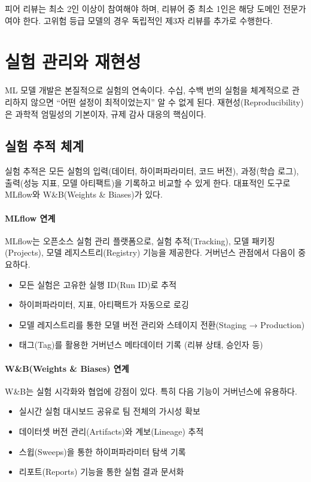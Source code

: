 피어 리뷰는 최소 2인 이상이 참여해야 하며, 리뷰어 중 최소 1인은 해당 도메인 전문가여야 한다. 고위험 등급 모델의 경우 독립적인 제3자 리뷰를 추가로 수행한다.

\section{실험 관리와 재현성}
\label{sec:10.2}

ML 모델 개발은 본질적으로 실험의 연속이다. 수십, 수백 번의 실험을 체계적으로 관리하지 않으면 ``어떤 설정이 최적이었는지'' 알 수 없게 된다. 재현성(Reproducibility)은 과학적 엄밀성의 기본이자, 규제 감사 대응의 핵심이다.

\subsection{실험 추적 체계}
\label{sec:10.2.1}

실험 추적은 모든 실험의 입력(데이터, 하이퍼파라미터, 코드 버전), 과정(학습 로그), 출력(성능 지표, 모델 아티팩트)을 기록하고 비교할 수 있게 한다. 대표적인 도구로 MLflow와 W\&B(Weights \& Biases)가 있다.

\paragraph{MLflow 연계} MLflow는 오픈소스 실험 관리 플랫폼으로, 실험 추적(Tracking), 모델 패키징(Projects), 모델 레지스트리(Registry) 기능을 제공한다. 거버넌스 관점에서 다음이 중요하다.
\begin{itemize}
  \item 모든 실험은 고유한 실행 ID(Run ID)로 추적
  \item 하이퍼파라미터, 지표, 아티팩트가 자동으로 로깅
  \item 모델 레지스트리를 통한 모델 버전 관리와 스테이지 전환(Staging → Production)
  \item 태그(Tag)를 활용한 거버넌스 메타데이터 기록 (리뷰 상태, 승인자 등)
\end{itemize}

\paragraph{W\&B(Weights \& Biases) 연계} W\&B는 실험 시각화와 협업에 강점이 있다. 특히 다음 기능이 거버넌스에 유용하다.
\begin{itemize}
  \item 실시간 실험 대시보드 공유로 팀 전체의 가시성 확보
  \item 데이터셋 버전 관리(Artifacts)와 계보(Lineage) 추적
  \item 스윕(Sweeps)을 통한 하이퍼파라미터 탐색 기록
  \item 리포트(Reports) 기능을 통한 실험 결과 문서화
\end{itemize}


